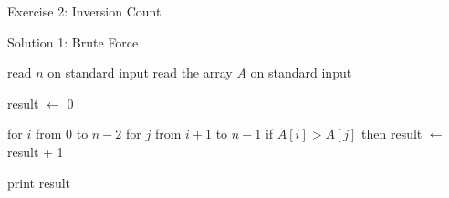 \documentclass{beamer}
\begin{document}
\begin{frame}[fragile]{Exercise 2: Inversion Count}

  \begin{code}{Solution 1: Brute Force}
    \begin{PseudoCode}
read $n$ on standard input
read the array $A$ on standard input

result $\leftarrow$ 0

for $i$ from 0 to $n-2$
    for $j$ from $i+1$ to $n-1$
        if $A[i] > A[j]$ then
            result $\leftarrow$ result + 1

print result
    \end{PseudoCode}
  \end{code}

\end{frame}
\end{document}
